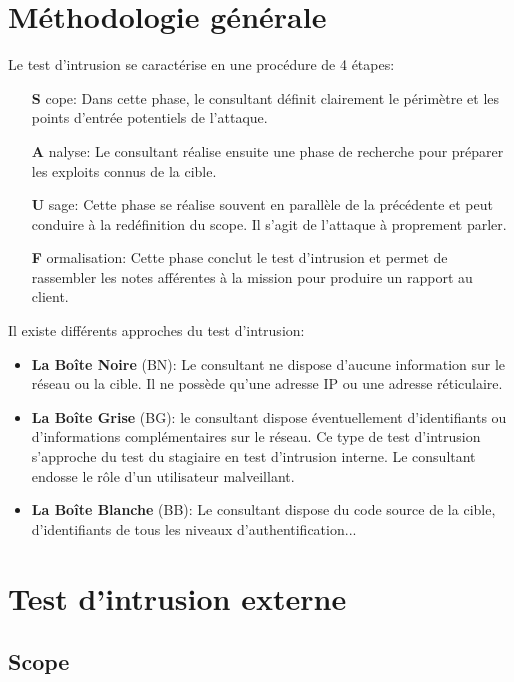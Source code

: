 \documentclass[twoside,a4paper,12pt,titlepage]{book}
\begin{document}
\section{Méthodologie générale}
Le test d'intrusion se caractérise en une procédure de 4 étapes:
\begin{itemize}
\item[\textbf{S}]cope: Dans cette phase, le consultant définit clairement le périmètre et les points d'entrée potentiels de l'attaque.
\item[\textbf{A}]nalyse: Le consultant réalise ensuite une phase de recherche pour préparer les exploits connus de la cible.
\item[\textbf{U}]sage: Cette phase se réalise souvent en parallèle de la précédente et peut conduire à la redéfinition du scope. Il s'agit de l'attaque à proprement parler.
\item[\textbf{F}]ormalisation: Cette phase conclut le test d'intrusion et permet de rassembler les notes afférentes à la mission pour produire un rapport au client. 
\end{itemize}
Il existe différents approches du test d'intrusion:\begin{itemize}
	\item \textbf{La Boîte Noire} (BN): Le consultant ne dispose d'aucune information sur le réseau ou la cible. Il ne possède qu'une adresse IP ou une adresse réticulaire.
	\item \textbf{La Boîte Grise} (BG): le consultant dispose éventuellement d'identifiants ou d'informations complémentaires sur le réseau. Ce type de test d'intrusion s'approche du test du stagiaire en test d'intrusion interne. Le consultant endosse le rôle d'un utilisateur malveillant.
	\item \textbf{La Boîte Blanche} (BB): Le consultant dispose du code source de la cible, d'identifiants de tous les niveaux d'authentification...
\end{itemize}


\section{Test d'intrusion externe}
\subsection{Scope}
\end{document}
